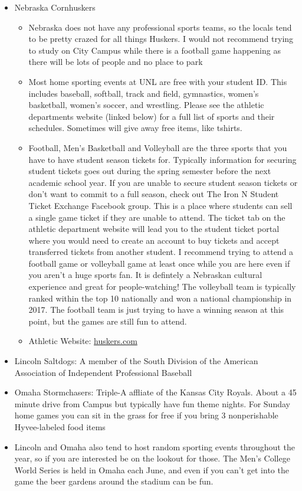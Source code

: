\documentclass[
  12pt,
]{book}
\begin{document}
\begin{itemize}
\item Nebraska Cornhuskers
\begin{itemize}
\item Nebraska does not have any professional sports teams, so the locals tend to be pretty crazed for all things Huskers. I would not recommend trying to study on City Campus while there is a football game happening as there will be lots of people and no place to park
\item Most home sporting events at UNL are free with your student ID. This includes baseball, softball, track and field, gymnastics, women's basketball, women's soccer, and wrestling. Please see the athletic departments website (linked below) for a full list of sports and their schedules. Sometimes will give away free items, like tshirts. 
\item Football, Men's Basketball and Volleyball are the three sports that you have to have student season tickets for. Typically information for securing student tickets goes out during the spring semester before the next academic school year. If you are unable to secure student season tickets or don't want to commit to a full season, check out The Iron N Student Ticket Exchange Facebook group. This is a place where students can sell a single game ticket if they are unable to attend. The ticket tab on the athletic department website will lead you to the student ticket portal where you would need to create an account to buy tickets and accept transferred tickets from another student. I recommend trying to attend a football game or volleyball game at least once while you are here even if you aren't a huge sports fan. It is defintely a Nebraskan cultural experience and great for people-watching! The volleyball team is typically ranked within the top 10 nationally and won a national championship in 2017. The football team is just trying to have a winning season at this point, but the games are still fun to attend. 
\item Athletic Website: \href{https://huskers.com}{huskers.com}
\end{itemize}
\item Lincoln Saltdogs: A member of the South Division of the American Association of Independent Professional Baseball
\item Omaha Stormchasers: Triple-A affliate of the Kansas City Royals. About a 45 minute drive from Campus but typically have fun theme nights. For Sunday home games you can sit in the grass for free if you bring 3 nonperishable Hyvee-labeled food items
\item Lincoln and Omaha also tend to host random sporting events throughout the year, so if you are interested be on the lookout for those. The Men's College World Series is held in Omaha each June, and even if you can't get into the game the beer gardens around the stadium can be fun. 
\end{itemize}
\end{document}
